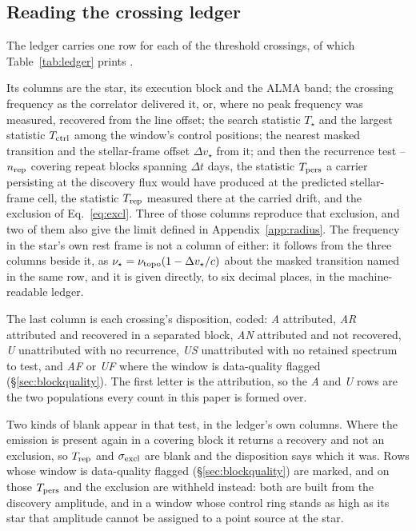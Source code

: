 \subsection{Reading the crossing ledger}
\label{sec:ledgercolumns}

The ledger carries one row for each of the \EvNCrossRaw{} threshold
crossings, of which Table~\ref{tab:ledger} prints \SiLdgSampN.

Its columns are the star, its execution block and
the ALMA band; the crossing frequency as the correlator delivered it, or,
where no peak frequency was measured, recovered from the line offset; the
search statistic $T_\star$ and
the largest statistic $T_{\rm ctrl}$ among the window's \NCtrl{} control
positions; the nearest masked transition and the stellar-frame offset
$\Delta v_\star$ from it; and then the recurrence test -- $n_{\rm rep}$
covering repeat blocks spanning $\Delta t$ days, the statistic $T_{\rm pers}$
a carrier persisting at the discovery flux would have produced at the
predicted stellar-frame cell, the statistic $T_{\rm rep}$ measured there at
the carried drift, and the exclusion of Eq.~\ref{eq:excl}. Three of those
columns reproduce that exclusion, and two of them also give the limit defined
in Appendix~\ref{app:radius}. The
frequency in the star's own rest frame is
not a column of either: it follows from the three columns beside
it, as $\nu_\star=\nu_{\rm topo}(1-\Delta v_\star/c)$ about the masked
transition named in the same row, and it is given directly, to six decimal
places, in the machine-readable ledger.

The last column is each crossing's disposition, coded: \emph{A} attributed,
\emph{AR} attributed and recovered in a separated block, \emph{AN}
attributed and not recovered, \emph{U} unattributed with no recurrence,
\emph{US} unattributed with no retained spectrum to test, and \emph{AF} or
\emph{UF} where the window is data-quality flagged
(\S\ref{sec:blockquality}). The first letter is the attribution, so the
\emph{A} and \emph{U} rows are the two populations every count in this paper
is formed over.

Two kinds of blank appear in that test, in the ledger's own columns. Where the
emission is present again in
a covering block it returns a recovery and not an exclusion, so
$T_{\rm rep}$ and $\sigma_{\rm excl}$ are blank and the disposition says which
it was. Rows whose window is data-quality flagged
(\S\ref{sec:blockquality}) are marked, and on those $T_{\rm pers}$ and the
exclusion are withheld instead: both are built from the discovery amplitude,
and in a window whose control ring stands as high as its star that amplitude
cannot be assigned to a point source at the star.


